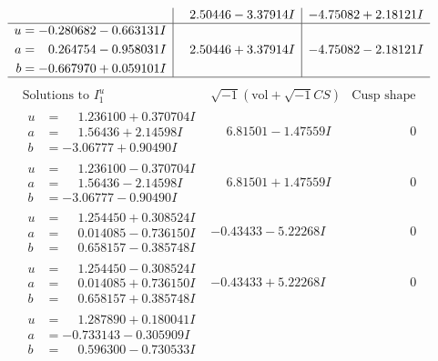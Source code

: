 \documentclass[1p]{elsarticle_modified}
\theoremstyle{definition}
\newcommand{\I}{\sqrt{-1}}
\begin{document}
$$\begin{array}{c|c|c}
 & \phantom{-}2.50446 - 3.37914 I & -4.75082 + 2.18121 I \\ \hline\begin{aligned}
u &= -0.280682 - 0.663131 I \\
a &= \phantom{-}0.264754 - 0.958031 I \\
b &= -0.667970 + 0.059101 I\end{aligned}
 & \phantom{-}2.50446 + 3.37914 I & -4.75082 - 2.18121 I\\
 \hline 
 \end{array}$$\newpage$$\begin{array}{c|c|c}  
\text{Solutions to }I^u_{1}& \I (\text{vol} + \sqrt{-1}CS) & \text{Cusp shape}\\
 \hline 
\begin{aligned}
u &= \phantom{-}1.236100 + 0.370704 I \\
a &= \phantom{-}1.56436 + 2.14598 I \\
b &= -3.06777 + 0.90490 I\end{aligned}
 & \phantom{-}6.81501 - 1.47559 I & \phantom{-0.000000 } 0 \\ \hline\begin{aligned}
u &= \phantom{-}1.236100 - 0.370704 I \\
a &= \phantom{-}1.56436 - 2.14598 I \\
b &= -3.06777 - 0.90490 I\end{aligned}
 & \phantom{-}6.81501 + 1.47559 I & \phantom{-0.000000 } 0 \\ \hline\begin{aligned}
u &= \phantom{-}1.254450 + 0.308524 I \\
a &= \phantom{-}0.014085 - 0.736150 I \\
b &= \phantom{-}0.658157 - 0.385748 I\end{aligned}
 & -0.43433 - 5.22268 I & \phantom{-0.000000 } 0 \\ \hline\begin{aligned}
u &= \phantom{-}1.254450 - 0.308524 I \\
a &= \phantom{-}0.014085 + 0.736150 I \\
b &= \phantom{-}0.658157 + 0.385748 I\end{aligned}
 & -0.43433 + 5.22268 I & \phantom{-0.000000 } 0 \\ \hline\begin{aligned}
u &= \phantom{-}1.287890 + 0.180041 I \\
a &= -0.733143 - 0.305909 I \\
b &= \phantom{-}0.596300 - 0.730533 I\end{aligned}

\end{array}$$
\end{document}
